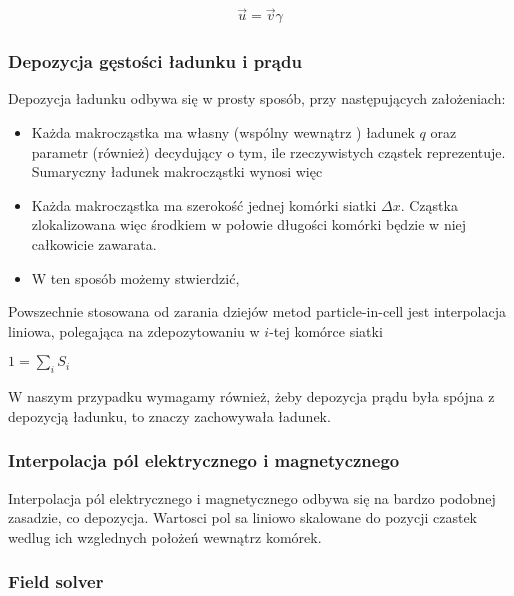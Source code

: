     \begin{align}
        \vec{u} = \vec{v} \gamma
        \label{eqn:gamma-transformation}
    \end{align}
    \subsubsection{Depozycja gęstości ładunku i prądu} 
    Depozycja ładunku odbywa się w prosty sposób, przy następujących założeniach:
    \begin{itemize}
        \item Każda makrocząstka ma własny (wspólny wewnątrz )
            ładunek $q$ oraz parametr  (również)
            decydujący o tym, ile rzeczywistych cząstek reprezentuje.
            Sumaryczny ładunek makrocząstki wynosi więc 
        \item Każda makrocząstka ma szerokość jednej komórki siatki $\Delta x$.
            Cząstka zlokalizowana więc środkiem
            w połowie długości komórki będzie w niej całkowicie zawarata.
        \item W ten sposób możemy stwierdzić, 
    \end{itemize}

    Powszechnie stosowana od zarania dziejów metod particle-in-cell
     jest interpolacja liniowa, polegająca na
    zdepozytowaniu w $i$-tej komórce siatki 

    $1 = \sum_i S_i$ 

    W naszym przypadku wymagamy również, żeby depozycja prądu była spójna z
    depozycją ładunku, to znaczy zachowywała ładunek.

    \subsubsection{Interpolacja pól elektrycznego i magnetycznego}
    Interpolacja pól elektrycznego i magnetycznego odbywa się na bardzo podobnej zasadzie, co depozycja.
    Wartosci pol sa liniowo skalowane do pozycji czastek wedlug ich wzglednych położeń wewnątrz komórek.

    \subsubsection{Field solver} 

